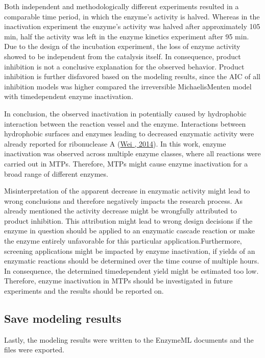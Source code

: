 \documentclass[letterpaper,12pt,english]{jupyterBook}
\begin{document}
\sphinxAtStartPar
Both independent and methodologically different experiments resulted in a comparable time period, in which the enzyme’s activity is halved. Whereas in the inactivation experiment the enzyme’s activity was halved after approximately 105 min, half the activity was left in the enzyme kinetics experiment after 95 min. Due to the design of the incubation experiment, the loss of enzyme activity showed to be independent from the catalysis itself. In consequence, product inhibition is not a conclusive explanation for the observed behavior. Product inhibition is further disfavored based on the modeling results, since the AIC of all inhibition models was higher compared the irreversible Michaelis\sphinxhyphen{}Menten model with time\sphinxhyphen{}dependent enzyme inactivation.

\sphinxAtStartPar
In conclusion, the observed inactivation in potentially caused by hydrophobic interaction between the reaction vessel and the enzyme. Interactions between hydrophobic surfaces and enzymes leading to decreased enzymatic activity were already reported for ribonuclease A (\hyperlink{cite.references:id29}{Wei , 2014}). In this work, enzyme inactivation was observed across multiple enzyme classes, where all reactions were carried out in MTPs. Therefore, MTPs might cause enzyme inactivation for a broad range of different enzymes.

\sphinxAtStartPar
Misinterpretation of the apparent decrease in enzymatic activity might lead to wrong conclusions and therefore negatively impacts the research process. As already mentioned the activity decrease might be wrongfully attributed to product inhibition. This attribution might lead to wrong design decisions if the enzyme in question should be applied to an enzymatic cascade reaction or make the enzyme entirely unfavorable for this particular application.Furthermore, screening applications might be impacted by enzyme inactivation, if yields of an enzymatic reactions should be determined over the time course of multiple hours. In consequence, the determined time\sphinxhyphen{}dependent yield might be estimated too low.
Therefore, enzyme inactivation in MTPs should be investigated in future experiments and the results should be reported on.


\subsection{Save modeling results}
\label{\detokenize{scenarios/enzyme_inactivation:save-modeling-results}}
\sphinxAtStartPar
Lastly, the modeling results were written to the EnzymeML documents and the files were exported.
\end{document}
